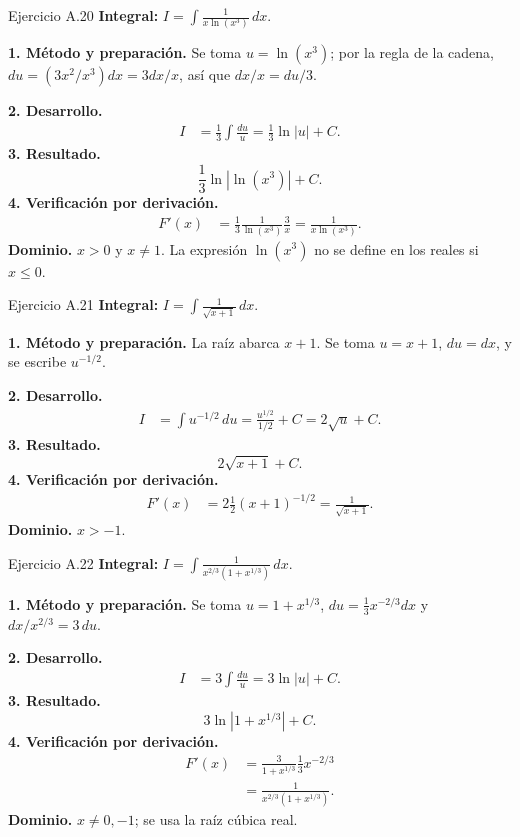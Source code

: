 \begin{examplebox}{Ejercicio A.20}
\textbf{Integral:} $\displaystyle I=\int \frac1{x\ln(x^3)}\,dx$.

\textbf{1. Método y preparación.} Se toma $u=\ln(x^3)$; por la regla de la cadena, $du=(3x^2/x^3)dx=3dx/x$, así que $dx/x=du/3$.

\textbf{2. Desarrollo.}
\begin{align*}
I&=\frac13\int\frac{du}{u}=\frac13\ln|u|+C.
\end{align*}
\textbf{3. Resultado.}
\[
\frac13\ln|\ln(x^3)|+C.
\]
\textbf{4. Verificación por derivación.}
\begin{align*}
F'(x)&=\frac13\frac1{\ln(x^3)}\frac3x=\frac1{x\ln(x^3)}.
\end{align*}
\textbf{Dominio.} $x>0$ y $x\ne1$. La expresión $\ln(x^3)$ no se define en los reales si $x\le0$.
\end{examplebox}

\begin{examplebox}{Ejercicio A.21}
\textbf{Integral:} $\displaystyle I=\int \frac1{\sqrt{x+1}}\,dx$.

\textbf{1. Método y preparación.} La raíz abarca $x+1$. Se toma $u=x+1$, $du=dx$, y se escribe $u^{-1/2}$.

\textbf{2. Desarrollo.}
\begin{align*}
I&=\int u^{-1/2}\,du=\frac{u^{1/2}}{1/2}+C=2\sqrt u+C.
\end{align*}
\textbf{3. Resultado.}
\[
2\sqrt{x+1}+C.
\]
\textbf{4. Verificación por derivación.}
\begin{align*}
F'(x)&=2\frac12(x+1)^{-1/2}=\frac1{\sqrt{x+1}}.
\end{align*}
\textbf{Dominio.} $x>-1$.
\end{examplebox}

\begin{examplebox}{Ejercicio A.22}
\textbf{Integral:} $\displaystyle I=\int \frac1{x^{2/3}(1+x^{1/3})}\,dx$.

\textbf{1. Método y preparación.} Se toma $u=1+x^{1/3}$, $du=\tfrac13x^{-2/3}dx$ y $dx/x^{2/3}=3\,du$.

\textbf{2. Desarrollo.}
\begin{align*}
I&=3\int\frac{du}{u}=3\ln|u|+C.
\end{align*}
\textbf{3. Resultado.}
\[
3\ln|1+x^{1/3}|+C.
\]
\textbf{4. Verificación por derivación.}
\begin{align*}
F'(x)&=\frac3{1+x^{1/3}}\frac13x^{-2/3}\\&=\frac1{x^{2/3}(1+x^{1/3})}.
\end{align*}
\textbf{Dominio.} $x\ne0,-1$; se usa la raíz cúbica real.
\end{examplebox}

